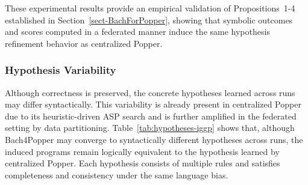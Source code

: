 These experimental results provide an empirical validation of Propositions~1-4 established in Section~\ref{sect-BachForPopper}, showing that symbolic outcomes and scores computed in a federated manner induce the same hypothesis refinement behavior as centralized Popper.

\subsubsection{Hypothesis Variability}
Although correctness is preserved, the concrete hypotheses learned across runs may differ syntactically.
This variability is already present in centralized Popper due to its heuristic-driven ASP search and is further amplified in the federated setting by data partitioning.
Table~\ref{tab:hypotheses-iggp} shows that, although Bach4Popper may converge to syntactically different hypotheses across runs, the induced programs remain
logically equivalent to the hypothesis learned by centralized Popper. Each hypothesis consists of multiple rules and satisfies completeness and
consistency under the same language bias.


